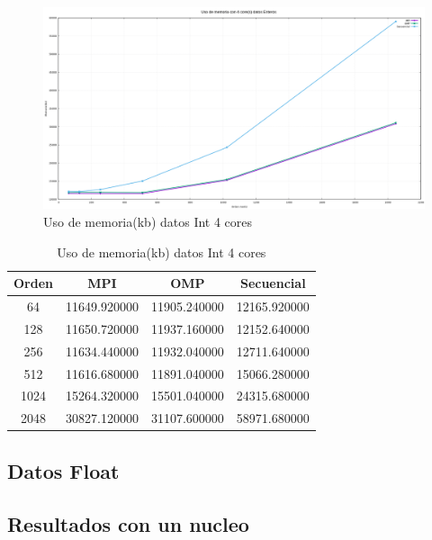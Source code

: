 \documentclass[10pt]{IEEEtran}
\begin{document}
\begin{figure}[H]
  \centering
  \includegraphics[width=0.95\linewidth]{figs/4nucleosEnterosMemoria.png}
  \caption{Uso de memoria(kb) datos Int 4 cores}
  \label{fig:in2}
\end{figure}

\begin{table}[H]
  \caption{Uso de memoria(kb) datos Int 4 cores}
  \label{table_example}
  \centering
  \begin{tabular}{|c|c|c|c|}
    \hline
    \textbf{Orden} & \textbf{MPI} & \textbf{OMP} & \textbf{Secuencial} \\
    \hline
    64 & 11649.920000 & 11905.240000 & 12165.920000 \\
    128 & 11650.720000 & 11937.160000 & 12152.640000 \\
    256 & 11634.440000 & 11932.040000 & 12711.640000 \\
    512 & 11616.680000 & 11891.040000 & 15066.280000 \\
    1024 & 15264.320000 & 15501.040000 & 24315.680000 \\
    2048 & 30827.120000 & 31107.600000 & 58971.680000 \\
    \hline
  \end{tabular}
\end{table}

\subsection{Datos Float}

\subsection{Resultados con un nucleo}
\end{document}
